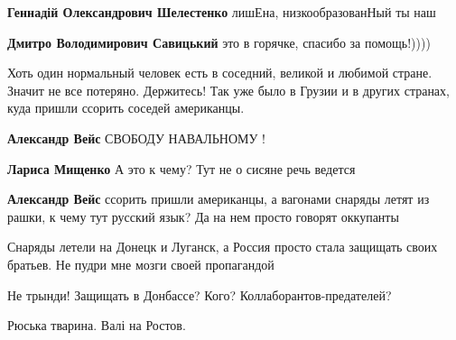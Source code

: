 \begin{itemize}
\begin{itemize}
\textbf{Геннадій Олександрович Шелестенко} лишЕна, низкообразованНый ты наш


\textbf{Дмитро Володимирович Савицький} это в горячке, спасибо за помощь!))))
\end{itemize}



Хоть один нормальный человек есть в соседний, великой и любимой стране. Значит
не все потеряно. Держитесь! Так уже было в Грузии и в других странах, куда
пришли ссорить соседей американцы.

\begin{itemize}

\textbf{Александр Вейс} СВОБОДУ НАВАЛЬНОМУ !


\textbf{Лариса Мищенко} А это к чему? Тут не о сисяне речь ведется


\textbf{Александр Вейс} ссорить пришли американцы, а вагонами снаряды летят из рашки, к чему тут русский язык?
Да на нем просто говорят оккупанты


Снаряды летели на Донецк и Луганск, а Россия просто стала защищать своих братьев. Не пудри мне мозги своей пропагандой


Не трынди! Защищать в Донбассе? Кого? Коллаборантов-предателей?
\end{itemize}


Рюська тварина. Валі на Ростов.

\begin{itemize}


\end{itemize}
\end{itemize}
